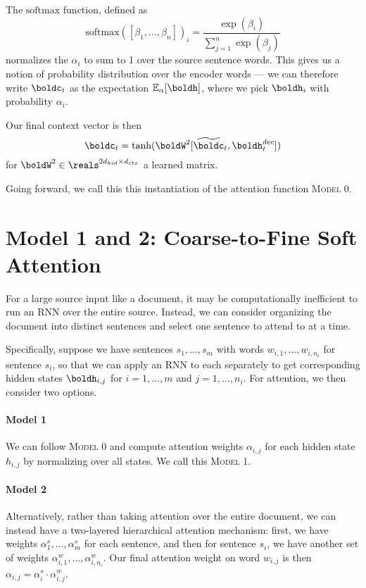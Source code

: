 \documentclass[11pt]{report}
\begin{document}
The $\mathrm{softmax}$ function, defined as
$$\mathrm{softmax}([\beta_1, \ldots, \beta_n])_i =  \frac{\exp(\beta_i)}{\sum_{j=1}^n \exp(\beta_j)}$$
normalizes the $\alpha_i$ to sum to 1 over the source sentence words. This gives us a notion of probability distribution over the encoder words --- we can therefore write $\boldc_t$ as the expectation $\mathbb{E}_\alpha[\boldh]$, where we pick $\boldh_i$ with probability $\alpha_i$.

Our final context vector is then
\begin{equation}
\boldc_t = \tanh(\boldW^2[\widetilde{\boldc}_t, \boldh_t^{dec}])
\end{equation}
for $\boldW^2 \in \reals^{2d_{hid} \times d_{ctx}}$ a learned matrix.

Going forward, we call this this instantiation of the attention function \textsc{Model 0}.


\section{Model 1 and 2: Coarse-to-Fine Soft Attention}

For a large source input like a document, it may be computationally inefficient to run an RNN over the entire source. Instead, we can consider organizing the document into distinct sentences and select one sentence to attend to at a time.

Specifically, suppose we have sentences $s_1, \ldots, s_m$ with words $w_{i,1}, \ldots, w_{i,n_i}$ for sentence $s_i$, so that we can apply an RNN to each separately to get corresponding hidden states $\boldh_{i,j}$ for $i = 1, \ldots, m$ and $j = 1, \ldots, n_i$.
For attention, we then consider two options.

\paragraph{Model 1} We can follow \textsc{Model 0} and compute attention weights $\alpha_{i,j}$ for each hidden state $h_{i,j}$ by normalizing over all states. We call this \textsc{Model 1}.

\paragraph{Model 2} Alternatively, rather than taking attention over the entire document, we can instead have a two-layered hierarchical attention mechanism: first, we have weights $\alpha_1^s, \ldots, \alpha_m^s$ for each sentence, and then for sentence $s_i$, we have another set of weights $\alpha_{i,1}^w, \ldots, \alpha_{i,n_i}^w$.
Our final attention weight on word $w_{i,j}$ is then $\alpha_{i,j} = \alpha_i^s \cdot \alpha_{i,j}^w$.
\end{document}
